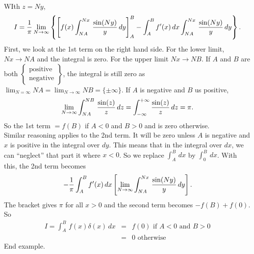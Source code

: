WIth $z = Ny$, 
$$I = {1\over\pi}\lim_{N\rightarrow\infty} \left\{ \left[ f(x) \int_{NA}^{Nx}\, {\sin(Ny)\over y}\,dy\right]_A^B - \int_A^B f'(x)\,dx \int_{NA}^{Nx}\, {\sin(Ny)\over y}\,dy \right\}.$$
First, we look at the 1st term on the right hand side. For the lower limit, $Nx\rightarrow NA$ and the integral is zero. For the upper limit $Nx \rightarrow NB$. If $A$ and $B$ are both 
$\left\{\begin{matrix}
\mbox{positive} \\
\mbox{negative} 
\end{matrix}\right\}$, the integral is still zero as $\displaystyle \lim_{N=\infty} NA = \lim_{N \rightarrow \infty} NB = \{\pm \infty\}$.
If $A$ is negative and $B$ us positive, 
$$\lim_{N\rightarrow\infty}\int_{NA}^{NB}\, {\sin(z)\over z}\,dz = \int_{-\infty}^{+\infty} {\sin(z)\over z}\,dz = \pi.$$
So the 1st term $= f(B)$ if $A<0$ and $B>0$ and is zero otherwise.\\
Similar reasoning applies to the 2nd term. It will be zero unless $A$ is negative and $x$ is positive in the integral over $dy$. This means that in the integral over $dx$, we can ``neglect'' that
part it where $x<0$. So we replace $\int_A^B\,dx$ by $\int_0^B\, dx$. With this, the 2nd term becomes 
$$- {1\over\pi} \int_A^B f'(x)\,dx \left[ \lim_{N\rightarrow\infty} \int_{NA}^{Nx} \, {\sin(Ny)\over y} \,dy \right].$$
The bracket gives $\pi$ for all $x>0$ and the second term becomes $-f(B) + f(0)$. So 
\begin{eqnarray*}
I = \int_A^B\, f(x)\delta(x)\, dx &=& f(0) \mbox{ if } A<0 \mbox{ and } B>0\\
&=& 0 \mbox{ otherwise}
\end{eqnarray*}
End example.\\

